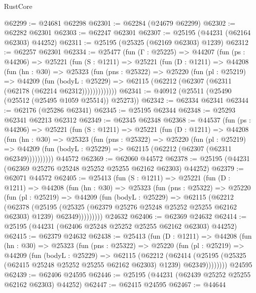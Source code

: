\begin{lexlean}{RustCore}
\begin{coremodule}
@62299 := @24681 @62298
@62301 := @62284 (@24679 @62299)
@62302 := @62282 @62301
@62303 := @62247 @62301
@62307 := @25195 (@44231 (@62164 @62303) @44252)
@62311 := @25195 (@25325 (@62169 @62303) @1239)
@62312 := @62257 @62301
@62334 := @25477
    (fun (Γ : @25225) =>
    @44207
      (fun (ps : @44206) =>
      @25221
        (fun (S : @1211) =>
        @25221
          (fun (D : @1211) =>
          @44208
            (fun (hn : @30) =>
            @25323
              (fun (pns : @25322) =>
              @25220
                (fun (pl : @25219) =>
                @44209
                  (fun (bodyL : @25229) =>
                  @62115 (@62212 (@62307 (@62311 (@62178 (@62214 @62312)))))))))))))
@62341 := @40912 (@25511 (@25490 (@25512 (@25495 @1059 @25514)) @25273))
@62342 := @62334 @62341
@62344 := @62176 (@25286 @62341)
@62345 := @25195 @62344
@62348 := @25293 @62341 @62213 @62312
@62349 := @62345 @62348
@62368 := @44537
    (fun (ps : @44206) =>
    @25221
      (fun (S : @1211) =>
      @25221
        (fun (D : @1211) =>
        @44208
          (fun (hn : @30) =>
          @25323
            (fun (pns : @25322) =>
            @25220
              (fun (pl : @25219) =>
              @44209 (fun (bodyL : @25229) => @62115 (@62212 (@62307 (@62311 @62349))))))))))
    @44572
@62369 := @62060 @44572
@62378 := @25195 (@44231 (@62369 @25276 @25248 @25252 @25255 @62162 @62303) @44252)
@62379 := @62071 @44572
@62405 := @25413
    (fun (S : @1211) =>
    @25221
      (fun (D : @1211) =>
      @44208
        (fun (hn : @30) =>
        @25323
          (fun (pns : @25322) =>
          @25220
            (fun (pl : @25219) =>
            @44209
              (fun (bodyL : @25229) =>
              @62115
                (@62212
                  (@62378
                    (@25195
                      (@25325 (@62379 @25276 @25248 @25252 @25255 @62162 @62303) @1239)
                      @62349)))))))))
    @24632
@62406 := @62369 @24632
@62414 := @25195 (@44231 (@62406 @25248 @25252 @25255 @62162 @62303) @44252)
@62415 := @62379 @24632
@62438 := @25413
    (fun (D : @1211) =>
    @44208
      (fun (hn : @30) =>
      @25323
        (fun (pns : @25322) =>
        @25220
          (fun (pl : @25219) =>
          @44209
            (fun (bodyL : @25229) =>
            @62115
              (@62212
                (@62414
                  (@25195 (@25325 (@62415 @25248 @25252 @25255 @62162 @62303) @1239) @62349))))))))
    @24595
@62439 := @62406 @24595
@62446 := @25195 (@44231 (@62439 @25252 @25255 @62162 @62303) @44252)
@62447 := @62415 @24595
@62467 := @44644

\end{coremodule}
\end{lexlean}
